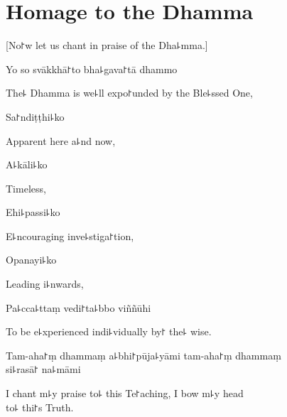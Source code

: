 \chapter{Homage to the Dhamma}                      %

\begin{leader}
\end{leader}

\begin{english}
  [No꜓w let us chant in praise of the Dha꜕mma.]
\end{english}

Yo so svākkhā꜓to bha꜕gava꜓tā dhammo

\begin{english}
  The꜕ Dhamma is we꜕ll expo꜓unded by the Ble꜕ssed One,
\end{english}

Sa꜓ndiṭṭhi꜕ko

\begin{english}
  Apparent here a꜕nd now,
\end{english}

A꜕kāli꜕ko

\begin{english}
  Timeless,
\end{english}

Ehi꜕passi꜕ko

\begin{english}
  E꜕ncouraging inve꜕stiga꜓tion,
\end{english}

Opanayi꜕ko

\begin{english}
  Leading i꜕nwards,
\end{english}

Pa꜕cca꜕ttaṃ vedi꜓ta꜕bbo viññūhi%

\begin{english}
  To be e꜕xperienced indi꜕vidually by꜓ the꜕ wise.
\end{english}

Tam-aha꜓ṃ dhammaṃ a꜕bhi꜓pūja꜕yāmi tam-aha꜓ṃ dhammaṃ \\si꜕rasā꜓ na꜕māmi

\begin{english}
  I chant m꜕y praise to꜕ this Te꜓aching, I bow m꜕y head\\ to꜕ thi꜓s Truth.
\end{english}

\clearpage

